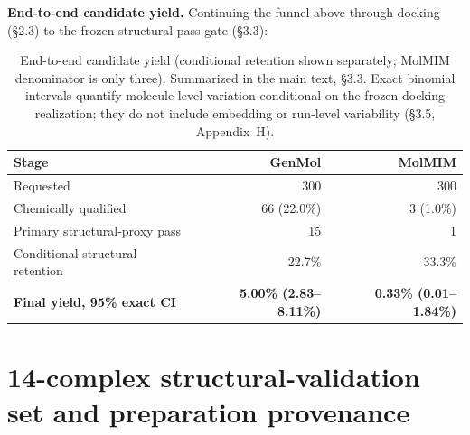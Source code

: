 \documentclass{article}
\begin{document}
\textbf{End-to-end candidate yield.} Continuing the funnel above through docking (\S2.3) to the frozen structural-pass gate (\S3.3):

\begin{table}[h]
\centering
\footnotesize
\begin{tabular}{lrr}
\toprule
Stage & GenMol & MolMIM \\
\midrule
Requested & 300 & 300 \\
Chemically qualified & 66 (22.0\%) & 3 (1.0\%) \\
Primary structural-proxy pass & 15 & 1 \\
Conditional structural retention & 22.7\% & 33.3\% \\
\textbf{Final yield, 95\% exact CI} & \textbf{5.00\% (2.83--8.11\%)} & \textbf{0.33\% (0.01--1.84\%)} \\
\bottomrule
\end{tabular}
\caption{End-to-end candidate yield (conditional retention shown separately; MolMIM denominator is only three). Summarized in the main text, \S3.3. Exact binomial intervals quantify molecule-level variation conditional on the frozen docking realization; they do not include embedding or run-level variability (\S3.5, Appendix~H).}
\end{table}

\FloatBarrier
\section{14-complex structural-validation set and preparation provenance}
\label{app:c}
\end{document}
